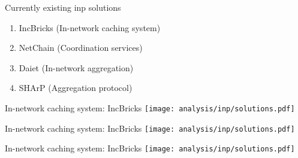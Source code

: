 \begin{frame}{Currently existing \gls*{inp} solutions}
    \begin{enumerate}
        \item IncBricks (In-network caching system) %
        \item NetChain (Coordination services) %
        \item Daiet (In-network aggregation) %
        \item SHArP (Aggregation protocol) %
    \end{enumerate}
\end{frame}

\begin{frame}{In-network caching system: IncBricks}
    \centering
    \texttt{[image: analysis/inp/solutions.pdf]}
\end{frame}

\begin{frame}{In-network caching system: IncBricks}
    \centering
    \texttt{[image: analysis/inp/solutions.pdf]}
\end{frame}

\begin{frame}{In-network caching system: IncBricks}
    \centering
    \texttt{[image: analysis/inp/solutions.pdf]}
\end{frame}

